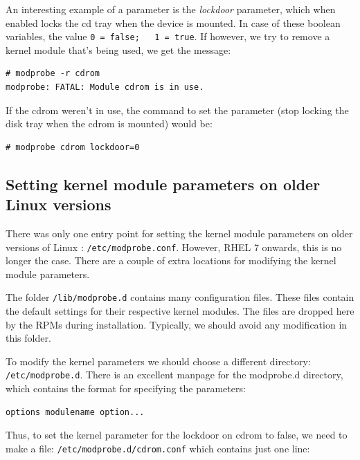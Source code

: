 \noindent
An interesting example of a parameter is the \textit{lockdoor} parameter, which when enabled locks the cd tray when the device is mounted. In case of these boolean variables, the value \verb|0 = false;	1 = true|. If however, we try to remove a kernel module that's being used, we get the message:

\vspace{-15pt}
\begin{verbatim}
# modprobe -r cdrom
modprobe: FATAL: Module cdrom is in use.
\end{verbatim}
\vspace{-10pt}

\noindent
If the cdrom weren't in use, the command to set the parameter (stop locking the disk tray when the cdrom is mounted) would be: 

\vspace{-15pt}
\begin{verbatim}
# modprobe cdrom lockdoor=0
\end{verbatim}
\vspace{-10pt}

\subsection{Setting kernel module parameters on older Linux versions}
There was only one entry point for setting the kernel module parameters on older versions of Linux : \verb|/etc/modprobe.conf|. However, RHEL 7 onwards, this is no longer the case. There are a couple of extra locations for modifying the kernel module parameters. 

The folder \verb|/lib/modprobe.d| contains many configuration files. These files contain the default settings for their respective kernel modules. The files are dropped here by the RPMs during installation. Typically, we should avoid any modification in this folder. 

To modify the kernel parameters we should choose a different directory: \verb|/etc/modprobe.d|. There is an excellent manpage for the modprobe.d directory, which contains the format for specifying the parameters:

\vspace{-15pt}
\begin{verbatim}
options modulename option...
\end{verbatim}
\vspace{-10pt}

\noindent
Thus, to set the kernel parameter for the lockdoor on cdrom to false, we need to make a file: \verb|/etc/modprobe.d/cdrom.conf| which contains just one line:

